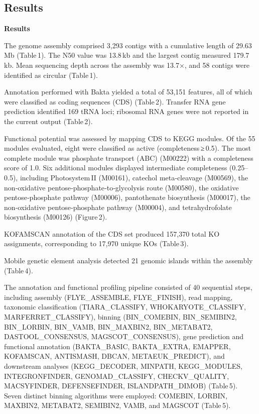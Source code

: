 \documentclass[
  11pt,
]{article}
\begin{document}
\subsection{Results}\label{results}

\textbf{Results}

The genome assembly comprised 3,293 contigs with a cumulative length of
29.63\,Mb (Table\,1). The N50 value was 13.8\,kb and the largest contig
measured 179.7\,kb. Mean sequencing depth across the assembly was 13.7×,
and 58 contigs were identified as circular (Table\,1).

Annotation performed with Bakta yielded a total of 53,151 features, all
of which were classified as coding sequences (CDS) (Table\,2). Transfer
RNA gene prediction identified 169 tRNA loci; ribosomal RNA genes were
not reported in the current output (Table\,2).

Functional potential was assessed by mapping CDS to KEGG modules. Of the
55 modules evaluated, eight were classified as active
(completeness\,≥\,0.5). The most complete module was phosphate transport
(ABC) (M00222) with a completeness score of 1.0. Six additional modules
displayed intermediate completeness (0.25--0.5), including
Photosystem\,II (M00161), catechol meta‑cleavage (M00569), the
non‑oxidative pentose‑phosphate‑to‑glycolysis route (M00580), the
oxidative pentose‑phosphate pathway (M00006), pantothenate biosynthesis
(M00017), the non‑oxidative pentose‑phosphate pathway (M00004), and
tetrahydrofolate biosynthesis (M00126) (Figure\,2).

KOFAMSCAN annotation of the CDS set produced 157,370 total KO
assignments, corresponding to 17,970 unique KOs (Table\,3).

Mobile genetic element analysis detected 21 genomic islands within the
assembly (Table\,4).

The annotation and functional profiling pipeline consisted of 40
sequential steps, including assembly (FLYE\_ASSEMBLE, FLYE\_FINISH),
read mapping, taxonomic classification (TIARA\_CLASSIFY,
WHOKARYOTE\_CLASSIFY, MARFERRET\_CLASSIFY), binning (BIN\_COMEBIN,
BIN\_SEMIBIN2, BIN\_LORBIN, BIN\_VAMB, BIN\_MAXBIN2, BIN\_METABAT2,
DASTOOL\_CONSENSUS, MAGSCOT\_CONSENSUS), gene prediction and functional
annotation (BAKTA\_BASIC, BAKTA\_EXTRA, EMAPPER, KOFAMSCAN, ANTISMASH,
DBCAN, METAEUK\_PREDICT), and downstream analyses (KEGG\_DECODER,
MINPATH, KEGG\_MODULES, INTEGRONFINDER, GENOMAD\_CLASSIFY,
CHECKV\_QUALITY, MACSYFINDER, DEFENSEFINDER, ISLANDPATH\_DIMOB)
(Table\,5). Seven distinct binning algorithms were employed: COMEBIN,
LORBIN, MAXBIN2, METABAT2, SEMIBIN2, VAMB, and MAGSCOT (Table\,5).
\end{document}
